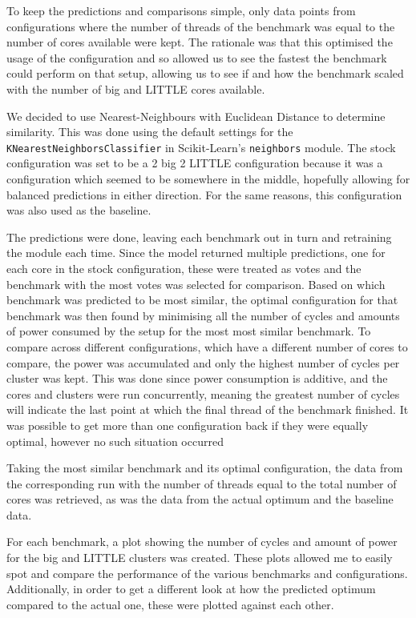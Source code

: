     To keep the predictions and comparisons simple, only data points from 
    configurations where the number of threads of the benchmark was equal to 
    the number of cores available were kept. The rationale was that this 
    optimised the usage of the configuration and so allowed us to see the 
    fastest the benchmark could perform on that setup, allowing us to see if and
    how the benchmark scaled with the number of big and LITTLE cores available.
    
    We decided to use Nearest-Neighbours with Euclidean Distance to determine 
    similarity. This was done using the default settings for the 
    \texttt{KNearestNeighborsClassifier} in Scikit-Learn's 
    \cite{pedregosa_scikit-learn_2011} \texttt{neighbors} module. The stock 
    configuration was set to be a 2 big 2 LITTLE configuration because it was a 
    configuration which seemed to be somewhere in the middle, hopefully 
    allowing for balanced predictions in either direction. For the same reasons,
    this configuration was also used as the baseline.
    
    The predictions were done, leaving each benchmark out in turn and 
    retraining the module each time. Since the model returned multiple 
    predictions, one for each core in the stock configuration, these were 
    treated as votes and the benchmark with the most votes was selected for 
    comparison. Based on which benchmark was predicted to be most similar, the 
    optimal configuration for that benchmark was then found by minimising all 
    the number of cycles and amounts of power consumed by the setup for the most
    most similar benchmark. To compare across different configurations, which 
    have a different number of cores to compare, the power was accumulated and 
    only the highest number of cycles per cluster was kept. This was done since 
    power consumption is additive, and the cores and clusters were run
    concurrently, meaning the greatest number of cycles will indicate the last 
    point at which the final thread of the benchmark finished. It was possible 
    to get more than one configuration back if they were equally optimal, 
    however no such situation occurred
    
    Taking the most similar benchmark and its optimal configuration, the data 
    from the corresponding run with the number of threads equal to the total 
    number of cores was retrieved, as was the data from the actual optimum and
    the baseline data.
    
    For each benchmark, a plot showing the number of cycles and amount of power 
    for the big and LITTLE clusters was created. These plots allowed me to 
    easily spot and compare the performance of the various benchmarks and 
    configurations. Additionally, in order to get a different look at how the 
    predicted optimum compared to the actual one, these were plotted against 
    each other.
    
